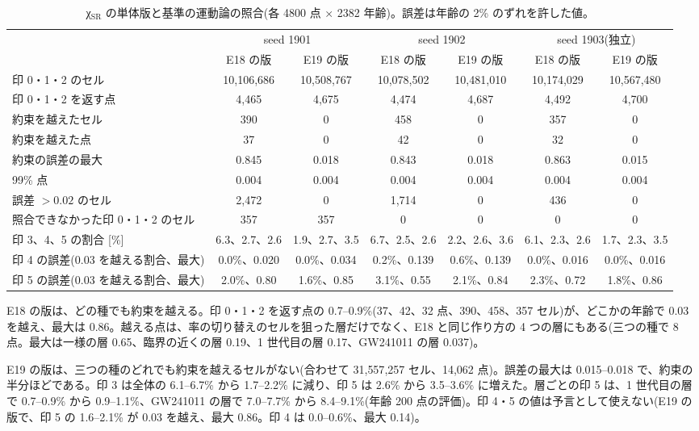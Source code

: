 \begin{table}[H]
\centering\footnotesize\setlength{\tabcolsep}{3.5pt}
\begin{tabular}{lcccccc}
\toprule
 & \multicolumn{2}{c}{seed 1901} & \multicolumn{2}{c}{seed 1902} & \multicolumn{2}{c}{seed 1903(独立)}\\
 & E18 の版 & E19 の版 & E18 の版 & E19 の版 & E18 の版 & E19 の版\\
\midrule
印 0・1・2 のセル & 10{,}106{,}686 & 10{,}508{,}767 & 10{,}078{,}502 & 10{,}481{,}010 & 10{,}174{,}029 & 10{,}567{,}480\\
印 0・1・2 を返す点 & 4{,}465 & 4{,}675 & 4{,}474 & 4{,}687 & 4{,}492 & 4{,}700\\
約束を越えたセル & 390 & 0 & 458 & 0 & 357 & 0\\
約束を越えた点 & 37 & 0 & 42 & 0 & 32 & 0\\
約束の誤差の最大 & 0.845 & 0.018 & 0.843 & 0.018 & 0.863 & 0.015\\
99\% 点 & 0.004 & 0.004 & 0.004 & 0.004 & 0.004 & 0.004\\
誤差 $>0.02$ のセル & 2{,}472 & 0 & 1{,}714 & 0 & 436 & 0\\
照合できなかった印 0・1・2 のセル & 357 & 357 & 0 & 0 & 0 & 0\\
印 3、4、5 の割合 [\%] & 6.3、2.7、2.6 & 1.9、2.7、3.5 & 6.7、2.5、2.6 & 2.2、2.6、3.6 & 6.1、2.3、2.6 & 1.7、2.3、3.5\\
印 4 の誤差(0.03 を越える割合、最大) & 0.0\%、0.020 & 0.0\%、0.034 & 0.2\%、0.139 & 0.6\%、0.139 & 0.0\%、0.016 & 0.0\%、0.016\\
印 5 の誤差(0.03 を越える割合、最大) & 2.0\%、0.80 & 1.6\%、0.85 & 3.1\%、0.55 & 2.1\%、0.84 & 2.3\%、0.72 & 1.8\%、0.86\\
\bottomrule
\end{tabular}
\caption{χ$_\mathrm{SR}$ の単体版と基準の運動論の照合(各 4800 点 × 2382 年齢)。誤差は年齢の 2\% のずれを許した値。}
\label{tab:e19val}
\end{table}

E18 の版は、どの種でも約束を越える。印 0・1・2 を返す点の 0.7--0.9\%(37、42、32 点、390、458、357 セル)が、どこかの年齢で 0.03 を越え、最大は 0.86。越える点は、率の切り替えのセルを狙った層だけでなく、E18 と同じ作り方の 4 つの層にもある(三つの種で 8 点。最大は一様の層 0.65、臨界の近くの層 0.19、1 世代目の層 0.17、GW241011 の層 0.037)。

E19 の版は、三つの種のどれでも約束を越えるセルがない(合わせて 31{,}557{,}257 セル、14{,}062 点)。誤差の最大は 0.015--0.018 で、約束の半分ほどである。印 3 は全体の 6.1--6.7\% から 1.7--2.2\% に減り、印 5 は 2.6\% から 3.5--3.6\% に増えた。層ごとの印 5 は、1 世代目の層で 0.7--0.9\% から 0.9--1.1\%、GW241011 の層で 7.0--7.7\% から 8.4--9.1\%(年齢 200 点の評価)。印 4・5 の値は予言として使えない(E19 の版で、印 5 の 1.6--2.1\% が 0.03 を越え、最大 0.86。印 4 は 0.0--0.6\%、最大 0.14)。

